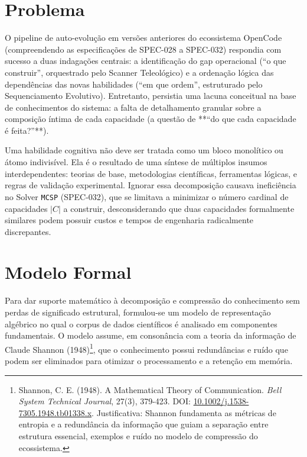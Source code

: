 \documentclass[12pt,a4paper,oneside]{abntex2}
\begin{document}
\section{Problema}

O pipeline de auto-evolução em versões anteriores do ecossistema OpenCode (compreendendo as especificações de SPEC-028 a SPEC-032) respondia com sucesso a duas indagações centrais: a identificação do gap operacional (``o que construir'', orquestrado pelo Scanner Teleológico) e a ordenação lógica das dependências das novas habilidades (``em que ordem'', estruturado pelo Sequenciamento Evolutivo). Entretanto, persistia uma lacuna conceitual na base de conhecimentos do sistema: a falta de detalhamento granular sobre a composição íntima de cada capacidade (a questão de **``do que cada capacidade é feita?''**).

Uma habilidade cognitiva não deve ser tratada como um bloco monolítico ou átomo indivisível. Ela é o resultado de uma síntese de múltiplos insumos interdependentes: teorias de base, metodologias científicas, ferramentas lógicas, e regras de validação experimental. Ignorar essa decomposição causava ineficiência no Solver \texttt{MCSP} (SPEC-032), que se limitava a minimizar o número cardinal de capacidades $|C|$ a construir, desconsiderando que duas capacidades formalmente similares podem possuir custos e tempos de engenharia radicalmente discrepantes.

\section{Modelo Formal}

Para dar suporte matemático à decomposição e compressão do conhecimento sem perdas de significado estrutural, formulou-se um modelo de representação algébrico no qual o corpus de dados científicos é analisado em componentes fundamentais. O modelo assume, em consonância com a teoria da informação de Claude Shannon (1948)\footnote{Shannon, C. E. (1948). A Mathematical Theory of Communication. \textit{Bell System Technical Journal}, 27(3), 379-423. DOI: \href{https://doi.org/10.1002/j.1538-7305.1948.tb01338.x}{10.1002/j.1538-7305.1948.tb01338.x}. Justificativa: Shannon fundamenta as métricas de entropia e a redundância da informação que guiam a separação entre estrutura essencial, exemplos e ruído no modelo de compressão do ecossistema.}, que o conhecimento possui redundâncias e ruído que podem ser eliminados para otimizar o processamento e a retenção em memória.
\end{document}
